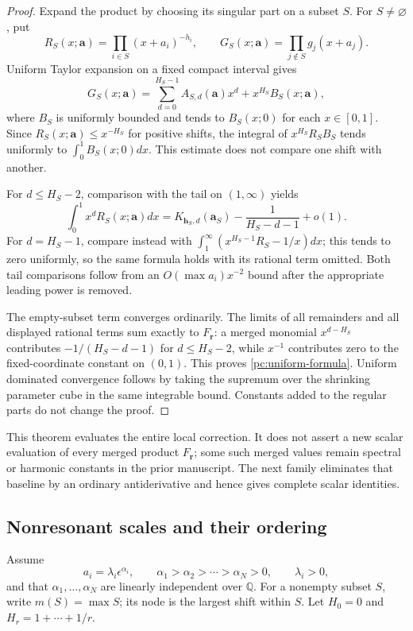 \documentclass[11pt,a4paper]{article}
\theoremstyle{definition}
\theoremstyle{remark}
\numberwithin{equation}{section}
\begin{document}
\begin{proof}
Expand the product by choosing its singular part on a subset $S$.
For $S\ne\varnothing$, put
\[
 R_S(x;\boldsymbol a)=\prod_{i\in S}(x+a_i)^{-h_i},\qquad
 G_S(x;\boldsymbol a)=\prod_{j\notin S}g_j(x+a_j).
\]
Uniform Taylor expansion on a fixed compact interval gives
\[
 G_S(x;\boldsymbol a)
    =\sum_{d=0}^{H_S-1}A_{S,d}(\boldsymbol a)x^d
                   +x^{H_S}B_S(x;\boldsymbol a),
\]
where $B_S$ is uniformly bounded and tends to $B_S(x;0)$ for each
$x\in[0,1]$.  Since $R_S(x;\boldsymbol a)\le x^{-H_S}$ for
positive shifts, the integral of $x^{H_S}R_SB_S$ tends uniformly
to $\int_0^1B_S(x;0)dx$.  This estimate does not compare one shift
with another.

For $d\le H_S-2$, comparison with the tail on $(1,\infty)$ yields
\[
 \int_0^1x^dR_S(x;\boldsymbol a)dx
       =K_{\boldsymbol h_S,d}(\boldsymbol a_S)
                              -\frac1{H_S-d-1}+o(1).
\]
For $d=H_S-1$, compare instead with
$\int_1^\infty(x^{H_S-1}R_S-1/x)dx$; this tends to zero uniformly,
so the same formula holds with its rational term omitted.  Both
tail comparisons follow from an $O(\max a_i)x^{-2}$ bound after
the appropriate leading power is removed.

The empty-subset term converges ordinarily.  The limits of all
remainders and all displayed rational terms sum exactly to
$F_{\boldsymbol r}$: a merged monomial $x^{d-H_S}$ contributes
$-1/(H_S-d-1)$ for $d\le H_S-2$, while $x^{-1}$ contributes
zero to the fixed-coordinate constant on $(0,1)$.  This proves
\eqref{pc:uniform-formula}.  Uniform dominated convergence follows
by taking the supremum over the shrinking parameter cube in the
same integrable bound.  Constants added to the regular parts
do not change the proof.
\end{proof}

This theorem evaluates the entire local correction.  It does not assert
a new scalar evaluation of every merged product $F_{\boldsymbol r}$;
some such merged values remain spectral or harmonic constants in the
prior manuscript.  The next family eliminates that baseline by an
ordinary antiderivative and hence gives complete scalar identities.

\subsection{Nonresonant scales and their ordering}

Assume
\begin{equation}\label{pc:scales}
 a_i=\lambda_i\epsilon^{\alpha_i},\qquad
 \alpha_1>\alpha_2>\cdots>\alpha_N>0,\qquad\lambda_i>0,
\end{equation}
and that $\alpha_1,\ldots,\alpha_N$ are linearly independent over
$\mathbb Q$.  For a nonempty subset $S$, write $m(S)=\max S$;
its node is the largest shift within $S$.  Let $H_0=0$ and
$H_r=1+\cdots+1/r$.
\end{document}
